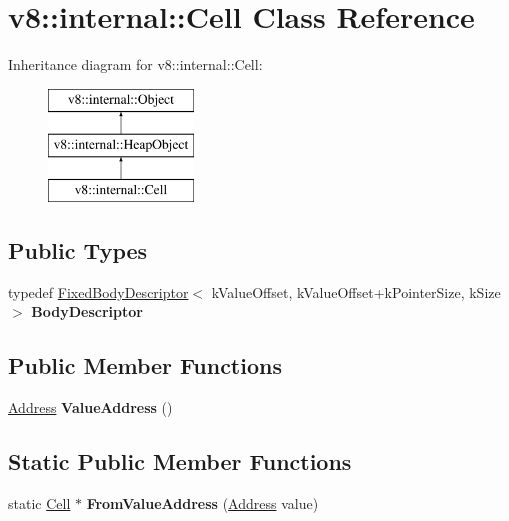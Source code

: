 \hypertarget{classv8_1_1internal_1_1Cell}{}\section{v8\+:\+:internal\+:\+:Cell Class Reference}
\label{classv8_1_1internal_1_1Cell}
Inheritance diagram for v8\+:\+:internal\+:\+:Cell\+:\begin{figure}[H]
\begin{center}
\leavevmode
\includegraphics[height=3.000000cm]{classv8_1_1internal_1_1Cell}
\end{center}
\end{figure}
\subsection*{Public Types}
\begin{DoxyCompactItemize}
\item 
\mbox{\label{classv8_1_1internal_1_1Cell_aab877bcc5c92876e1a09e984428a63fb}} 
typedef \mbox{\hyperlink{classv8_1_1internal_1_1FixedBodyDescriptor}{Fixed\+Body\+Descriptor}}$<$ k\+Value\+Offset, k\+Value\+Offset+k\+Pointer\+Size, k\+Size $>$ {\bfseries Body\+Descriptor}
\end{DoxyCompactItemize}
\subsection*{Public Member Functions}
\begin{DoxyCompactItemize}
\item 
\mbox{\label{classv8_1_1internal_1_1Cell_a118c6eaad39cc63e6468b83a4697edee}} 
\mbox{\hyperlink{classuintptr__t}{Address}} {\bfseries Value\+Address} ()
\end{DoxyCompactItemize}
\subsection*{Static Public Member Functions}
\begin{DoxyCompactItemize}
\item 
\mbox{\label{classv8_1_1internal_1_1Cell_ae7cb48a49636c3389d4dbfa21c06e340}} 
static \mbox{\hyperlink{classv8_1_1internal_1_1Cell}{Cell}} $\ast$ {\bfseries From\+Value\+Address} (\mbox{\hyperlink{classuintptr__t}{Address}} value)
\end{DoxyCompactItemize}
